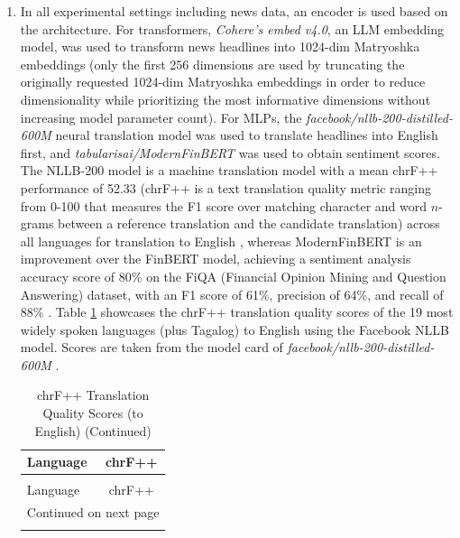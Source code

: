\documentclass[stu,floatsintext]{apa7}
\begin{document}
\begin{enumerate}
\item In all experimental settings including news data, an encoder is used based on the architecture. For transformers, \textit{Cohere's embed v4.0}, an LLM embedding model, was used to transform news headlines into 1024-dim Matryoshka embeddings (only the first 256 dimensions are used by truncating the originally requested 1024-dim Matryoshka embeddings in order to reduce dimensionality while prioritizing the most informative dimensions without increasing model parameter count). For MLPs, the \textit{facebook/nllb-200-distilled-600M} neural translation model was used to translate headlines into English first, and \textit{tabularisai/ModernFinBERT} was used to obtain sentiment scores. The NLLB-200 model is a machine translation model with a mean chrF++ performance of 52.33 (chrF++ is a text translation quality metric ranging from 0-100 that measures the F1 score over matching character and word $n$-grams between a reference translation and the candidate translation) across all languages for translation to English \parencite{facebook_nllb_600m}, whereas ModernFinBERT is an improvement over the FinBERT model, achieving a sentiment analysis accuracy score of 80\% on the FiQA (Financial Opinion Mining and Question Answering) dataset, with an F1 score of 61\%,	precision of 64\%, and recall of 88\% \parencite{tabularisai_modernfinbert}. Table \ref{tab:translation} showcases the chrF++ translation quality scores of the 19 most widely spoken languages (plus Tagalog) to English using the Facebook NLLB model. Scores are taken from the model card of \textit{facebook/nllb-200-distilled-600M} \parencite{facebook_nllb_600m}.

\begin{longtable}{@{}l c@{}}
\caption{chrF++ Translation Quality Scores (to English)}
\label{tab:translation} \\
\toprule
Language & chrF++ \\
\midrule
\endfirsthead

\caption[]{chrF++ Translation Quality Scores (to English) (Continued)} \\
\toprule
Language & chrF++ \\
\midrule
\endhead

\midrule
\multicolumn{2}{r}{Continued on next page} \\
\endfoot

\bottomrule
\endlastfoot


\end{longtable}
\end{enumerate}
\end{document}
